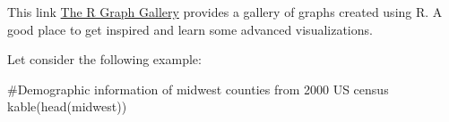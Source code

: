\documentclass[
  letterpaper,
  DIV=11,
  numbers=noendperiod]{scrreprt}
\newenvironment{Shaded}{\begin{snugshade}}{\end{snugshade}}
\newcommand{\CommentTok}[1]{\textcolor[rgb]{0.37,0.37,0.37}{#1}}
\newcommand{\FunctionTok}[1]{\textcolor[rgb]{0.28,0.35,0.67}{#1}}
\newcommand{\NormalTok}[1]{\textcolor[rgb]{0.00,0.23,0.31}{#1}}
\begin{document}
This link \href{https://www.r-graph-gallery.com/index.html}{The R Graph
Gallery} provides a gallery of graphs created using R. A good place to
get inspired and learn some advanced visualizations.

Let consider the following example:

\begin{Shaded}
\begin{Highlighting}[]
\CommentTok{\#Demographic information of midwest counties from 2000 US census}
\FunctionTok{kable}\NormalTok{(}\FunctionTok{head}\NormalTok{(midwest))}
\end{Highlighting}
\end{Shaded}

\begin{longtable}[]{@{}
  >{\raggedleft\arraybackslash}p{}
  >{\raggedright\arraybackslash}p{}
  >{\raggedright\arraybackslash}p{}
  >{\raggedleft\arraybackslash}p{}
  >{\raggedleft\arraybackslash}p{}
  >{\raggedleft\arraybackslash}p{}
  >{\raggedleft\arraybackslash}p{}
  >{\raggedleft\arraybackslash}p{}
  >{\raggedleft\arraybackslash}p{}
  >{\raggedleft\arraybackslash}p{}
  >{\raggedleft\arraybackslash}p{}
  >{\raggedleft\arraybackslash}p{}
  >{\raggedleft\arraybackslash}p{}
  >{\raggedleft\arraybackslash}p{}
  >{\raggedleft\arraybackslash}p{}
  >{\raggedleft\arraybackslash}p{}
  >{\raggedleft\arraybackslash}p{}
  >{\raggedleft\arraybackslash}p{}
  >{\raggedleft\arraybackslash}p{}
  >{\raggedleft\arraybackslash}p{}
  >{\raggedleft\arraybackslash}p{}
  >{\raggedleft\arraybackslash}p{}
  >{\raggedleft\arraybackslash}p{}
}
\end{longtable}
\end{document}
